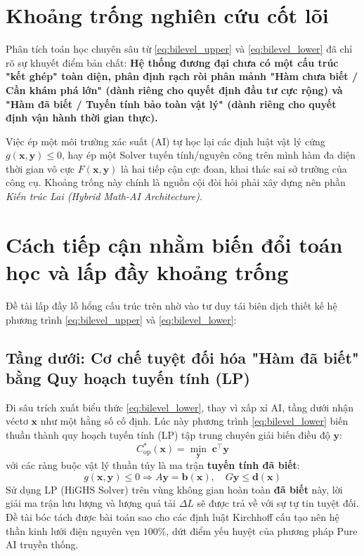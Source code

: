 \section{Khoảng trống nghiên cứu cốt lõi}

Phân tích toán học chuyên sâu từ \eqref{eq:bilevel_upper} và \eqref{eq:bilevel_lower} đã chỉ rõ sự khuyết điểm bản chất: \textbf{Hệ thống đương đại chưa có một cấu trúc "kết ghép" toàn diện, phân định rạch ròi phân mảnh "Hàm chưa biết / Cần khám phá lớn" (dành riêng cho quyết định đầu tư cực rộng) và "Hàm đã biết / Tuyến tính bảo toàn vật lý" (dành riêng cho quyết định vận hành thời gian thực).}

Việc ép một môi trường xác suất (AI) tự học lại các định luật vật lý cứng $g(\mathbf{x}, \mathbf{y}) \leq 0$, hay ép một Solver tuyến tính/nguyên cõng trên mình hàm đa diện thời gian vô cực $F(\mathbf{x}, \mathbf{y})$ là hai tiếp cận cực đoan, khai thác sai sở trường của công cụ. Khoảng trống này chính là nguồn cội đòi hỏi phải xây dựng nên phần \textit{Kiến trúc Lai (Hybrid Math-AI Architecture)}.

\section{Cách tiếp cận nhằm biến đổi toán học và lấp đầy khoảng trống}

Đề tài lấp đầy lỗ hổng cấu trúc trên nhờ vào tư duy tái biên dịch thiết kế hệ phương trình \eqref{eq:bilevel_upper} và \eqref{eq:bilevel_lower}:

\subsection{Tầng dưới: Cơ chế tuyệt đối hóa "Hàm đã biết" bằng Quy hoạch tuyến tính (LP)}
Đi sâu trích xuất biểu thức \eqref{eq:bilevel_lower}, thay vì xấp xỉ AI, tầng dưới nhận véctơ $\mathbf{x}$ như một hằng số cố định. Lúc này phương trình \eqref{eq:bilevel_lower} biến thuần thành quy hoạch tuyến tính (LP) tập trung chuyên giải biến điều độ $\mathbf{y}$:
\begin{equation} \label{eq:lower_lp_new}
    C_{\mathrm{op}}^*(\mathbf{x}) = \min_{\mathbf{y}} \; \mathbf{c}^\top \mathbf{y}
\end{equation}
với các ràng buộc vật lý thuần túy là ma trận \textbf{tuyến tính đã biết}: 
\begin{equation*}
    g(\mathbf{x}, \mathbf{y}) \leq 0 \Rightarrow A\mathbf{y} = \mathbf{b}(\mathbf{x}), \quad G\mathbf{y} \leq \mathbf{d}(\mathbf{x})
\end{equation*}
Sử dụng LP (HiGHS Solver) trên vùng không gian hoàn toàn \textbf{đã biết} này, lời giải ma trận lưu lượng và lượng quá tải $\Delta L$ sẽ được trả về với sự tự tin tuyệt đối. Đề tài bóc tách được bài toán sao cho các định luật Kirchhoff cấu tạo nên hệ thần kinh lưới điện nguyên vẹn $100\%$, dứt điểm yếu huyệt của phương pháp Pure AI truyền thống.

